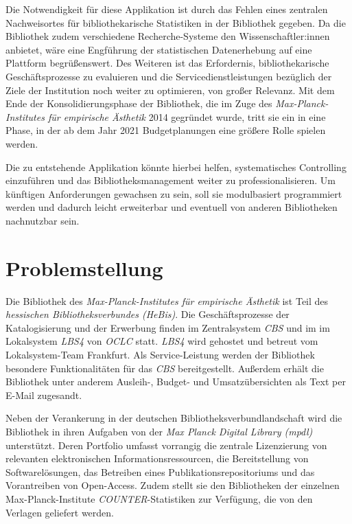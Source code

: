 Die Notwendigkeit für diese Applikation ist durch das
Fehlen eines zentralen Nachweisortes für bibliothekarische
Statistiken in der Bibliothek gegeben. Da die Bibliothek zudem verschiedene Recherche-Systeme den
Wissenschaftler:innen anbietet, wäre eine Engführung der statistischen
Datenerhebung auf eine Plattform begrüßenswert.
Des Weiteren ist das Erfordernis, bibliothekarische Geschäftsprozesse zu evaluieren und die
Servicedienstleistungen bezüglich der Ziele der Institution noch weiter zu
optimieren, von großer Relevanz. Mit dem Ende der Konsolidierungsphase der
Bibliothek, die im Zuge des \textit{Max-Planck-Institutes für empirische
Ästhetik} 2014 gegründet wurde, tritt sie ein in eine Phase, in der ab dem Jahr
2021 Budgetplanungen eine größere Rolle spielen werden.

Die zu entstehende Applikation könnte hierbei helfen, systematisches Controlling einzuführen und das
Bibliotheksmanagement weiter zu professionalisieren.
Um künftigen Anforderungen gewachsen zu sein, soll sie
modulbasiert programmiert werden und dadurch leicht erweiterbar und eventuell von
anderen Bibliotheken nachnutzbar sein.


\section{Problemstellung}
Die Bibliothek des \textit{Max-Planck-Institutes für empirische Ästhetik}
ist Teil des \textit{hessischen Bibliotheksverbundes (HeBis)}. Die Geschäftsprozesse
der Katalogisierung und der Erwerbung finden im Zentralsystem \textit{CBS} und im im Lokalsystem \textit{LBS4} von
\textit{OCLC} statt. \textit{LBS4} wird gehostet und betreut vom Lokalsystem-Team Frankfurt. Als Service-Leistung werden der Bibliothek besondere Funktionalitäten
für das \textit{CBS} bereitgestellt. Außerdem erhält die Bibliothek unter anderem Ausleih-, Budget- und
Umsatzübersichten als Text per E-Mail zugesandt.


Neben der Verankerung in der deutschen Bibliotheksverbundlandschaft
wird die Bibliothek in ihren Aufgaben von der
\textit{Max Planck Digital Library (mpdl)}
unterstützt. Deren Portfolio umfasst vorrangig die zentrale Lizenzierung
von relevanten elektronischen Informationsressourcen, die Bereitstellung
von Softwarelösungen, das Betreiben eines Publikationsrepositoriums und
das Vorantreiben von Open-Access. Zudem stellt sie den Bibliotheken der einzelnen Max-Planck-Institute
\textit{COUNTER}-Statistiken zur Verfügung, die von den Verlagen geliefert werden.

